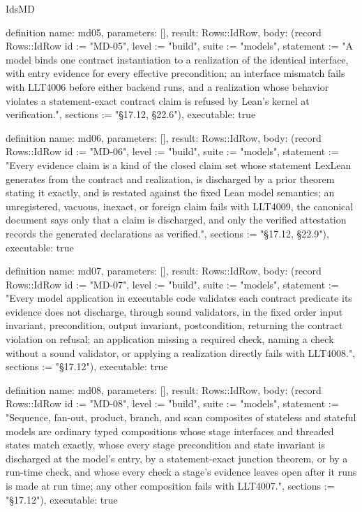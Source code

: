 \begin{lexlean}{IdsMD}
\begin{semanticmodule}
definition{
  name: md05,
  parameters: [],
  result: Rows::IdRow,
  body: (record Rows::IdRow {id := "MD-05", level := "build", suite := "models", statement := "A model binds one contract instantiation to a realization of the identical interface, with entry evidence for every effective precondition; an interface mismatch fails with LLT4006 before either backend runs, and a realization whose behavior violates a statement-exact contract claim is refused by Lean's kernel at verification.", sections := "§17.12, §22.6"}),
  executable: true
}

definition{
  name: md06,
  parameters: [],
  result: Rows::IdRow,
  body: (record Rows::IdRow {id := "MD-06", level := "build", suite := "models", statement := "Every evidence claim is a kind of the closed claim set whose statement LexLean generates from the contract and realization, is discharged by a prior theorem stating it exactly, and is restated against the fixed Lean model semantics; an unregistered, vacuous, inexact, or foreign claim fails with LLT4009, the canonical document says only that a claim is discharged, and only the verified attestation records the generated declarations as verified.", sections := "§17.12, §22.9"}),
  executable: true
}

definition{
  name: md07,
  parameters: [],
  result: Rows::IdRow,
  body: (record Rows::IdRow {id := "MD-07", level := "build", suite := "models", statement := "Every model application in executable code validates each contract predicate its evidence does not discharge, through sound validators, in the fixed order input invariant, precondition, output invariant, postcondition, returning the contract violation on refusal; an application missing a required check, naming a check without a sound validator, or applying a realization directly fails with LLT4008.", sections := "§17.12"}),
  executable: true
}

definition{
  name: md08,
  parameters: [],
  result: Rows::IdRow,
  body: (record Rows::IdRow {id := "MD-08", level := "build", suite := "models", statement := "Sequence, fan-out, product, branch, and scan composites of stateless and stateful models are ordinary typed compositions whose stage interfaces and threaded states match exactly, whose every stage precondition and state invariant is discharged at the model's entry, by a statement-exact junction theorem, or by a run-time check, and whose every check a stage's evidence leaves open after it runs is made at run time; any other composition fails with LLT4007.", sections := "§17.12"}),
  executable: true
}


\end{semanticmodule}
\end{lexlean}
